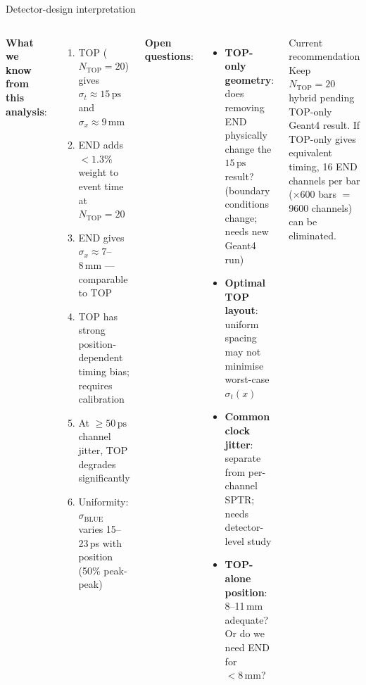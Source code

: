 \documentclass[aspectratio=169,9pt]{beamer}
\newcommand{\NTOP}{N_{\mathrm{TOP}}}
\newcommand{\ps}{\ensuremath{\,\mathrm{ps}}}
\newcommand{\mm}{\ensuremath{\,\mathrm{mm}}}
\begin{document}
\begin{frame}{Detector-design interpretation}
\begin{columns}[T]
\textbf{What we know from this analysis}:

\begin{enumerate}
  \item TOP ($\NTOP=20$) gives $\sigma_t \approx 15\ps$ and $\sigma_x \approx 9\mm$
  \item END adds $<1.3\%$ weight to event time at $\NTOP=20$
  \item END gives $\sigma_x \approx 7$--$8\mm$ — comparable to TOP
  \item TOP has strong position-dependent timing bias; requires calibration
  \item At $\geq 50\ps$ channel jitter, TOP degrades significantly
  \item Uniformity: $\sigma_{\mathrm{BLUE}}$ varies 15--23\,ps with position (50\% peak-peak)
\end{enumerate}

\textbf{Open questions}:

\begin{itemize}
  \item \textbf{TOP-only geometry}: does removing END physically change the $15\ps$ result?
    (boundary conditions change; needs new Geant4 run)
  \item \textbf{Optimal TOP layout}: uniform spacing may not minimise worst-case $\sigma_t(x)$
  \item \textbf{Common clock jitter}: separate from per-channel SPTR; needs detector-level study
  \item \textbf{TOP-alone position}: 8--11\,mm adequate? Or do we need END for $<8\mm$?
\end{itemize}

\vspace{4pt}
\begin{alertblock}{Current recommendation}
Keep $\NTOP=20$ hybrid pending TOP-only Geant4 result.
If TOP-only gives equivalent timing, 16 END channels
per bar ($\times 600$ bars $=$ 9600 channels) can be eliminated.
\end{alertblock}
\end{columns}
\end{frame}
\end{document}
